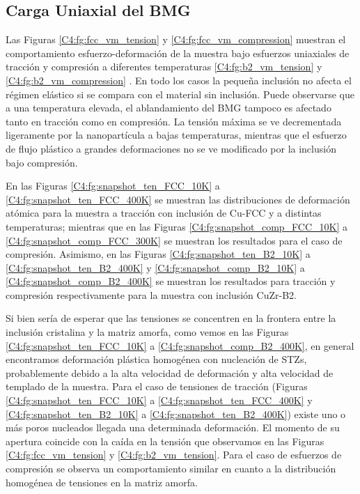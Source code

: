 \subsection{Carga Uniaxial del BMG}
\label{S4_2_2}


Las Figuras \ref{C4:fg:fcc_vm_tension} y \ref{C4:fg:fcc_vm_compression} muestran el comportamiento esfuerzo-deformación de la muestra bajo esfuerzos uniaxiales de tracción y compresión a diferentes temperaturas  \ref{C4:fg:b2_vm_tension} y \ref{C4:fg:b2_vm_compression} . En todo los casos la pequeña inclusión no afecta el régimen elástico si se compara con el material sin inclusión. Puede observarse que a una temperatura elevada, el ablandamiento del BMG tampoco es afectado tanto en tracción como en compresión. La tensión máxima se ve decrementada ligeramente por la nanopartícula a bajas temperaturas, mientras que el esfuerzo de flujo plástico a grandes deformaciones no se ve modificado por la inclusión bajo compresión.

En las Figuras \ref{C4:fg:snapshot_ten_FCC_10K} a \ref{C4:fg:snapshot_ten_FCC_400K} se muestran las distribuciones de deformación atómica para la muestra a tracción con inclusión de Cu-FCC y a distintas temperaturas; mientras que en las Figuras \ref{C4:fg:snapshot_comp_FCC_10K} a \ref{C4:fg:snapshot_comp_FCC_300K} se muestran los resultados para el caso de compresión. Asimismo, en las Figuras \ref{C4:fg:snapshot_ten_B2_10K} a \ref{C4:fg:snapshot_ten_B2_400K} y \ref{C4:fg:snapshot_comp_B2_10K} a \ref{C4:fg:snapshot_comp_B2_400K} se muestran los resultados para tracción y compresión respectivamente para la muestra con inclusión CuZr-B2.

Si bien sería de esperar que las tensiones se concentren en la frontera entre la inclusión cristalina y la matriz amorfa, como vemos en las Figuras \ref{C4:fg:snapshot_ten_FCC_10K} a \ref{C4:fg:snapshot_comp_B2_400K}, en general encontramos deformación plástica homogénea con nucleación de STZs, probablemente debido a la alta velocidad de deformación y alta velocidad de templado de la muestra. Para el caso de tensiones de tracción (Figuras \ref{C4:fg:snapshot_ten_FCC_10K} a \ref{C4:fg:snapshot_ten_FCC_400K} y \ref{C4:fg:snapshot_ten_B2_10K} a \ref{C4:fg:snapshot_ten_B2_400K}) existe uno o más poros nucleados llegada una determinada deformación. El momento de su apertura coincide con la caída en la tensión que observamos en las Figuras \ref{C4:fg:fcc_vm_tension} y \ref{C4:fg:b2_vm_tension}. Para el caso de esfuerzos de compresión se observa un comportamiento similar en cuanto a la distribución homogénea de tensiones en la matriz amorfa.

